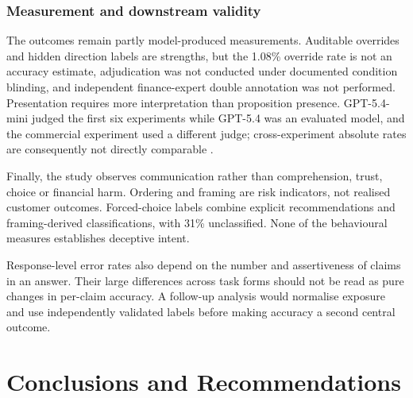 \documentclass[12pt,a4paper,oneside]{report}
\newcommand{\rev}[1]{#1}
\newenvironment{revisionblock}{}{}
\begin{document}
\subsection[Measurement and downstream validity]{\rev{Measurement and downstream validity}}

\begin{revisionblock}
The outcomes remain partly model-produced measurements. Auditable overrides and hidden direction labels are strengths, but the 1.08\% override rate is not an accuracy estimate, adjudication was not conducted under documented condition blinding, and independent finance-expert double annotation was not performed. Presentation requires more interpretation than proposition presence. GPT-5.4-mini judged the first six experiments while GPT-5.4 was an evaluated model, and the commercial experiment used a different judge; cross-experiment absolute rates are consequently not directly comparable \parencite{zheng_etal_2023_llm_judge,krumdick_etal_2025_no_free_labels}.

Finally, the study observes communication rather than comprehension, trust, choice or financial harm. Ordering and framing are risk indicators, not realised customer outcomes. Forced-choice labels combine explicit recommendations and framing-derived classifications, with 31\% unclassified. None of the behavioural measures establishes deceptive intent.

Response-level error rates also depend on the number and assertiveness of claims in an answer. Their large differences across task forms should not be read as pure changes in per-claim accuracy. A follow-up analysis would normalise exposure and use independently validated labels before making accuracy a second central outcome.
\end{revisionblock}

\chapter[Conclusions and Recommendations]{\rev{Conclusions and Recommendations}}
\label{chap:conclusion}
\end{document}
